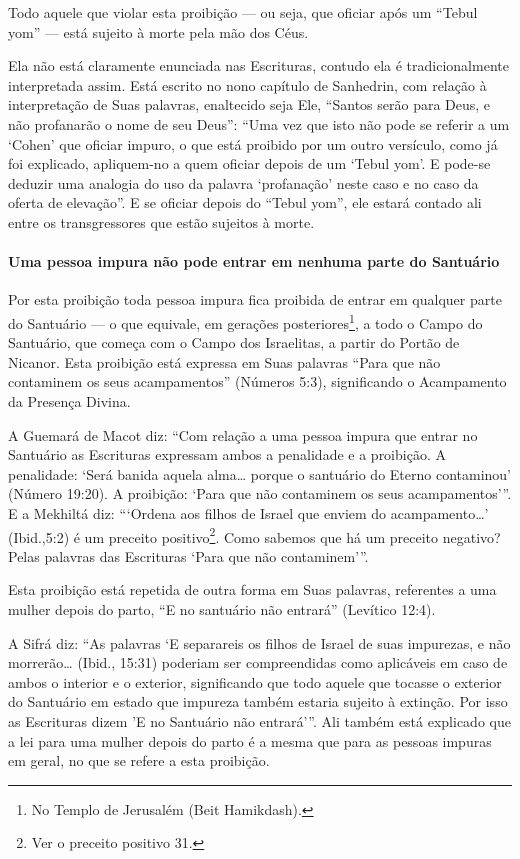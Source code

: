 Todo aquele que violar esta proibição --- ou seja, que oficiar após um
``Tebul yom'' --- está sujeito à morte pela mão dos Céus.

Ela não está claramente enunciada nas Escrituras, contudo ela é
tradicionalmente interpretada assim. Está escrito no nono capítulo de
Sanhedrin, com relação à interpretação de Suas palavras, enaltecido seja
Ele, ``Santos serão para Deus, e não profanarão o nome de seu Deus'': ``Uma vez que isto não
pode se referir a um `Cohen' que oficiar impuro, o que está proibido
por um outro versículo, como já foi explicado, apliquem-no a quem
oficiar depois de um `Tebul yom'. E pode-se deduzir uma analogia do uso
da palavra `profanação' neste caso e no caso da oferta de elevação''. E
se oficiar depois do ``Tebul yom'', ele estará contado ali entre os
transgressores que estão sujeitos à morte.

\paragraph{Uma pessoa impura não pode entrar em nenhuma parte do Santuário}

Por esta proibição toda pessoa impura fica proibida de entrar em
qualquer parte do Santuário --- o que equivale, em gerações
posteriores\footnote{No Templo de Jerusalém (Beit Hamikdash).}, a todo o Campo do Santuário, que
começa com o Campo dos Israelitas, a partir do Portão de Nicanor. Esta
proibição está expressa em Suas palavras ``Para que não contaminem os
seus acampamentos'' (Números 5:3), significando o Acampamento da
Presença Divina.

A Guemará de Macot diz: ``Com relação a uma pessoa impura que entrar no
Santuário as Escrituras expressam ambos a penalidade e a proibição. A
penalidade: `Será banida aquela alma\ldots{} porque o santuário do Eterno
contaminou' (Número 19:20). A proibição: `Para que não contaminem os
seus acampamentos'''. E a Mekhiltá diz: ```Ordena aos filhos de Israel
que enviem do acampamento\ldots{}' (Ibid.,5:2) é um preceito
positivo\footnote{Ver o preceito positivo 31.}. Como sabemos que há um preceito
negativo? Pelas palavras das Escrituras `Para que não contaminem'''.

Esta proibição está repetida de outra forma em Suas palavras, referentes
a uma mulher depois do parto, ``E no santuário não entrará'' (Levítico
12:4).

A Sifrá diz: ``As palavras `E separareis os filhos de Israel de suas
impurezas, e não morrerão\ldots{} (Ibid., 15:31) poderiam ser compreendidas
como aplicáveis em caso de ambos o interior e o exterior, significando
que todo aquele que tocasse o exterior do Santuário em estado que
impureza também estaria sujeito à extinção. Por isso as Escrituras dizem
'E no Santuário não entrará'''. Ali também está explicado que a lei para
uma mulher depois do parto é a mesma que para as pessoas impuras em
geral, no que se refere a esta proibição.

